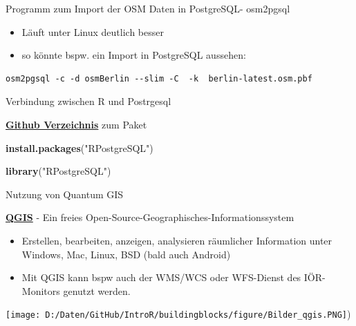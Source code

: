 \documentclass[ignorenonframetext,]{beamer}
\newenvironment{Shaded}{\begin{snugshade}}{\end{snugshade}}
\newcommand{\KeywordTok}[1]{\textcolor[rgb]{0.26,0.66,0.93}{\textbf{#1}}}
\newcommand{\StringTok}[1]{\textcolor[rgb]{0.02,0.61,0.04}{#1}}
\newcommand{\NormalTok}[1]{\textcolor[rgb]{0.74,0.68,0.62}{#1}}
\providecommand{\tightlist}{%
  \setlength{\itemsep}{0pt}\setlength{\parskip}{0pt}}
\begin{document}
\begin{frame}[fragile]{Programm zum Import der OSM Daten in PostgreSQL-
osm2pgsql}

\begin{itemize}
\tightlist
\item
  Läuft unter Linux deutlich besser
\item
  so könnte bspw. ein Import in PostgreSQL aussehen:
\end{itemize}

\begin{verbatim}
osm2pgsql -c -d osmBerlin --slim -C  -k  berlin-latest.osm.pbf
\end{verbatim}

\end{frame}

\begin{frame}[fragile]{Verbindung zwischen R und Postrgesql}

\begin{block}{\href{https://github.com/tomoakin/RPostgreSQL}{\textbf{Github
Verzeichnis}} zum Paket}

\begin{Shaded}
\begin{Highlighting}[]
\KeywordTok{install.packages}\NormalTok{(}\StringTok{"RPostgreSQL"}\NormalTok{)}
\end{Highlighting}
\end{Shaded}

\begin{Shaded}
\begin{Highlighting}[]
\KeywordTok{library}\NormalTok{(}\StringTok{"RPostgreSQL"}\NormalTok{)}
\end{Highlighting}
\end{Shaded}

\end{block}

\end{frame}

\begin{frame}{Nutzung von Quantum GIS}

\begin{block}{\href{https://www.qgis.org/de/site/}{\textbf{QGIS}} - Ein
freies Open-Source-Geographisches-Informationssystem}

\begin{itemize}
\tightlist
\item
  Erstellen, bearbeiten, anzeigen, analysieren räumlicher Information
  unter Windows, Mac, Linux, BSD (bald auch Android)
\item
  Mit QGIS kann bspw auch der WMS/WCS oder WFS-Dienst des IÖR-Monitors
  genutzt werden.
\end{itemize}

\texttt{[image: D:/Daten/GitHub/IntroR/buildingblocks/figure/Bilder\_qgis.PNG]})

\end{block}

\end{frame}
\end{document}

